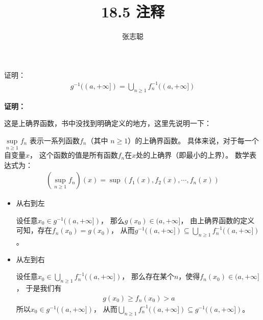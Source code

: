 \documentclass{article}
\begin{document}
\title{18.5 注释}
\author{张志聪}
\maketitle

\begin{zremark}
  证明：
  \begin{align*}
    g^{-1}((a, +\infty]) = \bigcup\limits_{n \geq 1} f_n^{-1}((a, +\infty])
  \end{align*}
\end{zremark}

\textbf{证明：}

这是上确界函数，书中没找到明确定义的地方，这里先说明一下：

$\sup\limits_{n \geq 1} f_n$ 表示一系列函数${f_n}$（其中 $n \geq 1$）的上确界函数。
具体来说，对于每一个自变量$x$，
这个函数的值是所有函数$f_n$在$x$处的上确界（即最小的上界）。
数学表达式为：
\begin{align*}
  \left( \sup\limits_{n \geq 1} f_n \right)(x) = \sup(f_1(x), f_2(x), \cdots, f_n(x))
\end{align*}

\begin{itemize}
  \item 从右到左

        设任意$x_0 \in g^{-1}((a, +\infty])$，
        那么$g(x_0) \in (a, +\infty]$，
        由上确界函数的定义可知，存在$f_n(x_0) = g(x_0)$，
        从而$g^{-1}((a, +\infty]) \subseteq \bigcup\limits_{n \geq 1} f_n^{-1}((a, +\infty])$。

  \item 从左到右

        设任意$x_0 \in \bigcup\limits_{n \geq 1} f_n^{-1}((a, +\infty])$，
        那么存在某个$n$，使得$f_n(x_0) \in (a, +\infty]$，
        于是我们有
        \begin{align*}
          g(x_0) \geq f_n(x_0) > a
        \end{align*}
        所以$x_0 \in g^{-1}((a, +\infty])$，
        从而$\bigcup\limits_{n \geq 1} f_n^{-1}((a, +\infty]) \subseteq g^{-1}((a, +\infty])$。
\end{itemize}
\end{document}
